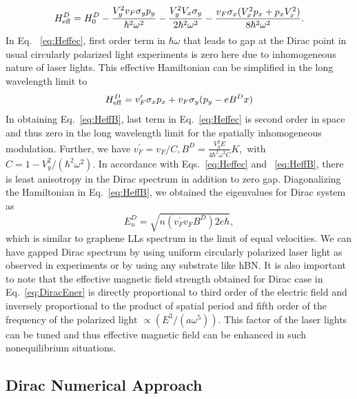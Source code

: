 \documentclass[aps,prl,showpacs,twocolumn,amsmath,amssymb,superscriptaddress]{revtex4-2}
\begin{document}
\begin{equation} \label{eq:Heffec}
	H_{\rm eff}^D=H_{0}^D-\frac{V_{y}^{2}v_F\sigma_{y}p_{y}}{\hbar^{2}\omega^{2}}
	-\frac{V_{y}^{2}V_{x}\sigma_{y}}{2\hbar^{2}\omega^{2}}-\frac{v_F\sigma
		_{x}(V_{x}^{2}p_{x}+p_{x}V_{x}^{2})}{8\hbar^{2}\omega^{2}}.
\end{equation}
In Eq. ~\eqref{eq:Heffec}, first order term in $\hbar \omega$ that leads to gap at the Dirac point in usual circularly polarized light experiments \cite{YHW, JWM} is zero here due to inhomogeneous nature of laser lights. This effective Hamiltonian can be simplified in the long wavelength limit to
\begin{equation} \label{eq:HeffB}
H_{\rm eff}^D = v_{F}^{\prime}\sigma_{x}p_{x}+v_F\sigma_{y}(p_{y}-eB^Dx)
\end{equation}%
In obtaining Eq.~\eqref{eq:HeffB}, last term in Eq.~\eqref{eq:Heffec} is second order in space and thus zero in the long wavelength limit for the spatially inhomogeneous modulation. Further, we have $v_{F}^{\prime}=v_F/C,B^D=\frac{V_{y}^{2}E}{4\hbar^{2}\omega^{3}C}K,$ with $C=1-V_{y}^{2}/(\hbar^{2}\omega^{2})$. In accordance with Eqs.~\eqref{eq:Heffec} and ~\eqref{eq:HeffB}, there is least anisotropy in the Dirac spectrum in addition to zero gap. Diagonalizing the Hamiltonian in Eq.~\eqref{eq:HeffB}, we obtained the eigenvalues for Dirac system as%
\begin{equation} \label{eq:DiracEner}
	E_{n}^D=\sqrt{n(v_{F}^{\prime}v_FB^D)2e\hbar},
\end{equation}
which is similar to graphene LLs spectrum in the limit of equal velocities. We can have gapped Dirac spectrum by using uniform circularly polarized laser light as observed in experiments \cite{YHW, JWM} or by using any substrate like hBN. It is also important to note that the effective magnetic field strength obtained for Dirac case in Eq.~\eqref{eq:DiracEner} is directly proportional to third order of the electric field and inversely proportional to the product of spatial period and fifth order of the frequency of the polarized light $\propto (E^3/(a\omega^5))$. This factor of the laser lights can be tuned and thus effective magnetic field can be enhanced in such nonequilibrium situations.

\subsection{Dirac Numerical Approach}
\end{document}
